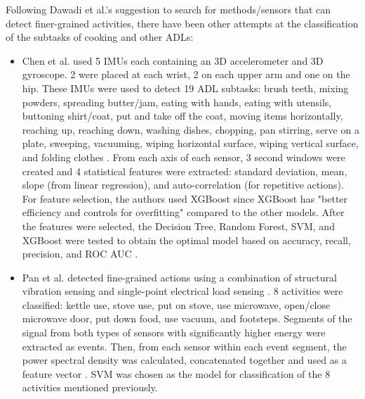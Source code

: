 Following Dawadi et al.'s suggestion to search for methods/sensors that can detect finer-grained activities, there have been other attempts at the classification of the subtasks of cooking and other ADLs: 
\begin{itemize}
    \item Chen et al. used 5 IMUs each containing an 3D accelerometer and 3D gyroscope. 2 were placed at each wrist, 2 on each upper arm and one on the hip. These IMUs were used to detect 19 ADL subtasks: brush teeth, mixing powders, spreading butter/jam, eating with hands, eating with utensils, buttoning shirt/coat, put and take off the coat, moving items horizontally, reaching up, reaching down, washing dishes, chopping, pan stirring, serve on a plate, sweeping, vacuuming, wiping horizontal surface, wiping vertical surface, and folding clothes \cite{chen_measuring_2021}. From each axis of each sensor, 3 second windows were created and 4 statistical features were extracted: standard deviation, mean, slope (from linear regression), and auto-correlation (for repetitive actions). For feature selection, the authors used XGBoost since XGBoost has "better efficiency and controls for overfitting" \cite{chen_measuring_2021} compared to the other models. After the features were selected, the Decision Tree, Random Forest, SVM, and XGBoost were tested to obtain the optimal model based on accuracy, recall, precision, and ROC AUC \cite{chen_measuring_2021}.
    \item Pan et al. detected fine-grained actions using a combination of structural vibration sensing and single-point electrical load sensing \cite{pan_fine-grained_2020}. 8 activities were classified: kettle use, stove use, put on stove, use microwave, open/close microwave door, put down food, use vacuum, and footsteps. Segments of the signal from both types of sensors with significantly higher energy were extracted as events. Then, from each sensor within each event segment, the power spectral density was calculated, concatenated together and used as a feature vector \cite{pan_fine-grained_2020}. SVM was chosen as the model for classification of the 8 activities mentioned previously. 
\end{itemize}


